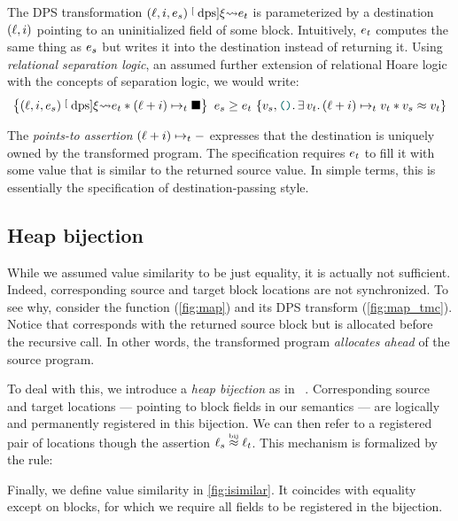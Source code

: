 The DPS transformation $(\datalangLoc, \datalangIdx, \datalangExpr_s) \tmcDps{\datalangRenaming} \datalangExpr_t$ is parameterized by a destination $(\datalangLoc, \datalangIdx)$ pointing to an uninitialized field of some block.
Intuitively, $\datalangExpr_t$ computes the same thing as $\datalangExpr_s$ but writes it into the destination instead of returning it.
Using \emph{relational separation logic}, an assumed further extension of relational Hoare logic with the concepts of separation logic, we would write:
\[
    \iRsimvHoare{
        (\datalangLoc, \datalangIdx, \datalangExpr_s) \tmcDps{\datalangRenaming} \datalangExpr_t \iSep
        (\datalangLoc + \datalangIdx) \iPointsto_t \datalangHole
    }{
        \datalangVal_s, \datalangUnit \ldotp
        \exists \datalangVal_t \ldotp
        (\datalangLoc + \datalangIdx) \iPointsto_t \datalangVal_t \iSep
        \datalangVal_s \iSimilar \datalangVal_t
    }{
        \datalangExpr_s
    }{
        \datalangExpr_t
    }
\]

The \emph{points-to assertion} $(\datalangLoc + \datalangIdx) \iPointsto_t -$ expresses that the destination is uniquely owned by the transformed program.
The specification requires $\datalangExpr_t$ to fill it with some value that is similar to the returned source value.
In simple terms, this is essentially the specification of destination-passing style.

\subsection{Heap bijection}

While we assumed value similarity to be just equality, it is actually not sufficient.
Indeed, corresponding source and target block locations are not synchronized.
To see why, consider the  function (\cref{fig:map}) and its DPS transform (\cref{fig:map_tmc}).
Notice that  corresponds with the returned source block  but is allocated before the recursive call.
In other words, the transformed program \emph{allocates ahead} of the source program.

To deal with this, we introduce a \emph{heap bijection} as in \Simuliris~\cite{DBLP:journals/pacmpl/GaherSSJDKKD22}.
Corresponding source and target locations --- pointing to block fields in our semantics --- are logically and permanently registered in this bijection. 
We can then refer to a registered pair of locations though the assertion $\datalangLoc_s \iInBij \datalangLoc_t$.
This mechanism is formalized by the  rule:

\begin{mathpar}
\end{mathpar}

Finally, we define value similarity in \cref{fig:isimilar}.
It coincides with equality except on blocks, for which we require all fields to be registered in the bijection.

